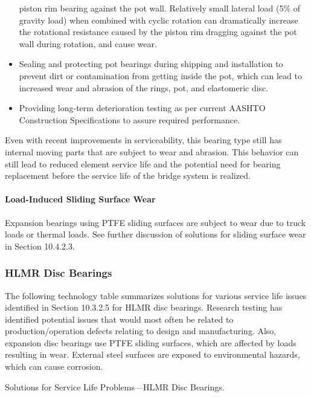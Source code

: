 \begin{itemize}
  piston rim bearing against the pot wall. Relatively small lateral load (5\% of gravity load) when combined
  with cyclic rotation can dramatically increase the rotational resistance caused by the piston rim dragging
  against the pot wall during rotation, and cause wear.
  \item Sealing and protecting pot bearings during shipping and installation to prevent dirt or contamination from
  getting inside the pot, which can lead to increased wear and abrasion of the rings, pot, and elastomeric disc.
  \item Providing long-term deterioration testing as per current AASHTO Construction Specifications to assure required performance.
\end{itemize}

Even with recent improvements in serviceability, this bearing type still has internal moving parts that are subject
to wear and abrasion. This behavior can still lead to reduced element service life and the potential need for bearing
replacement before the service life of the bridge system is realized.

\paragraph{Load-Induced Sliding Surface Wear}
Expansion bearings using PTFE sliding surfaces are subject to wear due to truck loads or thermal loads. See further discussion of solutions for sliding surface wear in Section 10.4.2.3.

\subsubsection{HLMR Disc Bearings}

The following technology table summarizes solutions for various service life issues identified in Section 10.3.2.5
for HLMR disc bearings. Research testing has identified potential issues that would most often be related to
production/operation defects relating to design and manufacturing. Also, expansion disc bearings use PTFE sliding
surfaces, which are affected by loads resulting in wear. External steel surfaces are exposed to environmental hazards,
which can cause corrosion.

\begin{table}
  \caption{Solutions for Service Life Problems—HLMR Disc Bearings.}
  \label{tab:solution-bearing-disc}
\end{table}

